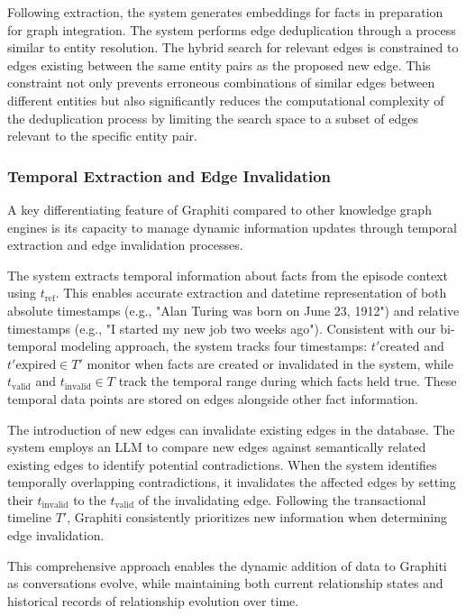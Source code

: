 \documentclass{article}
\begin{document}
Following extraction, the system generates embeddings for facts in preparation for graph integration. The system performs edge deduplication through a process similar to entity resolution. The hybrid search for relevant edges is constrained to edges existing between the same entity pairs as the proposed new edge. This constraint not only prevents erroneous combinations of similar edges between different entities but also significantly reduces the computational complexity of the deduplication process by limiting the search space to a subset of edges relevant to the specific entity pair.

\subsubsection{Temporal Extraction and Edge Invalidation}
A key differentiating feature of Graphiti compared to other knowledge graph engines is its capacity to manage dynamic information updates through temporal extraction and edge invalidation processes.

The system extracts temporal information about facts from the episode context using $t_\text{ref}$. This enables accurate extraction and datetime representation of both absolute timestamps (e.g., "Alan Turing was born on June 23, 1912") and relative timestamps (e.g., "I started my new job two weeks ago"). Consistent with our bi-temporal modeling approach, the system tracks four timestamps: $t'\text{created}$ and $t'\text{expired} \in T'$ monitor when facts are created or invalidated in the system, while $t_\text{valid}$ and $t_\text{invalid} \in T$ track the temporal range during which facts held true. These temporal data points are stored on edges alongside other fact information.

The introduction of new edges can invalidate existing edges in the database. The system employs an LLM to compare new edges against semantically related existing edges to identify potential contradictions. When the system identifies temporally overlapping contradictions, it invalidates the affected edges by setting their $t_\text{invalid}$ to the $t_\text{valid}$ of the invalidating edge. Following the transactional timeline $T'$, Graphiti consistently prioritizes new information when determining edge invalidation.

This comprehensive approach enables the dynamic addition of data to Graphiti as conversations evolve, while maintaining both current relationship states and historical records of relationship evolution over time.
\end{document}
